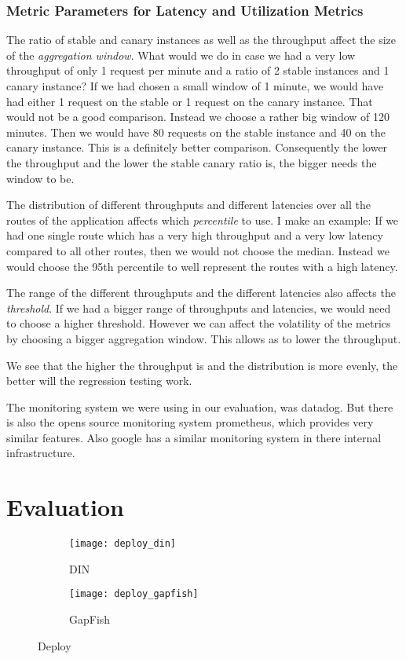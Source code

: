 \subsection{Metric Parameters for Latency and Utilization Metrics}

The ratio of stable and canary instances as well as the throughput affect the size of the
\emph{aggregation window}. What would we do in case we had a very low throughput of only 1
request per minute and a ratio of 2 stable instances and 1 canary instance? If we had
chosen a small window of 1 minute, we would have had either 1 request on the stable or 1
request on the canary instance. That would not be a good comparison. Instead we choose a
rather big window of 120 minutes. Then we would have 80 requests on the stable instance
and 40 on the canary instance. This is a definitely better comparison. Consequently the
lower the throughput and the lower the stable canary ratio is, the bigger needs the window
to be.

The distribution of different throughputs and different latencies over all the routes of
the application affects which \emph{percentile} to use. I make an example: If we had one
single route which has a very high throughput and a very low latency compared to all other
routes, then we would not choose the median. Instead we would choose the 95th percentile
to well represent the routes with a high latency.

The range of the different throughputs and the different latencies also affects the
\emph{threshold}. If we had a bigger range of throughputs and latencies, we would need to
choose a higher threshold. However we can affect the volatility of the metrics by choosing
a bigger aggregation window. This allows as to lower the throughput.

We see that the higher the throughput is and the distribution is more evenly, the better
will the regression testing work.

The monitoring system we were using in our evaluation, was datadog. But there is also the
opens source monitoring system prometheus, which provides very similar features. Also
google has a similar monitoring system in there internal infrastructure.

\chapter{Evaluation}

\begin{figure}[htbp]
  \centering
  \begin{subfigure}{.5\textwidth}
    \texttt{[image: deploy\_din]}
    \caption[DIN]{DIN}
    \label{fig:deploy_din}
  \end{subfigure}%
  \begin{subfigure}{.5\textwidth}
    \texttt{[image: deploy\_gapfish]}
    \caption[GapFish]{GapFish}
    \label{fig:deploy_gapfish}
  \end{subfigure}
  \caption[Deploy]{Deploy}
\end{figure}

